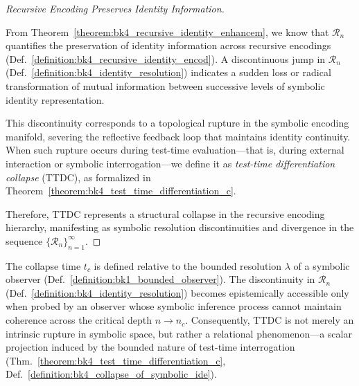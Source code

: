 \begin{proof}[Recursive Encoding Preserves Identity Information]
\label{proof:bk4_recursive_identity_preservation}
\leavevmode

From Theorem~\ref{theorem:bk4_recursive_identity_enhancem}, we know that $\mathcal{R}_n$ quantifies the preservation of identity information across recursive encodings (Def.~\ref{definition:bk4_recursive_identity_encod}). A discontinuous jump in $\mathcal{R}_n$ (Def.~\ref{definition:bk4_identity_resolution}) indicates a sudden loss or radical transformation of mutual information between successive levels of symbolic identity representation.

This discontinuity corresponds to a topological rupture in the symbolic encoding manifold, severing the reflective feedback loop that maintains identity continuity. When such rupture occurs during test-time evaluation---that is, during external interaction or symbolic interrogation---we define it as \emph{test-time differentiation collapse} (TTDC), as formalized in Theorem~\ref{theorem:bk4_test_time_differentiation_c}.

Therefore, TTDC represents a structural collapse in the recursive encoding hierarchy, manifesting as symbolic resolution discontinuities and divergence in the sequence $\{\mathcal{R}_n\}_{n=1}^{\infty}$.
\end{proof}

\begin{remark}
\label{remark:bk4_observer_relative_ttdc}
The collapse time $t_c$ is defined relative to the bounded resolution $\lambda$ of a symbolic observer (Def.~\ref{definition:bk1_bounded_observer}). The discontinuity in $\mathcal{R}_n$ (Def.~\ref{definition:bk4_identity_resolution}) becomes epistemically accessible only when probed by an observer whose symbolic inference process cannot maintain coherence across the critical depth $n \to n_c$. Consequently, TTDC is not merely an intrinsic rupture in symbolic space, but rather a relational phenomenon---a scalar projection induced by the bounded nature of test-time interrogation (Thm.~\ref{theorem:bk4_test_time_differentiation_c}, Def.~\ref{definition:bk4_collapse_of_symbolic_ide}).
\end{remark}

